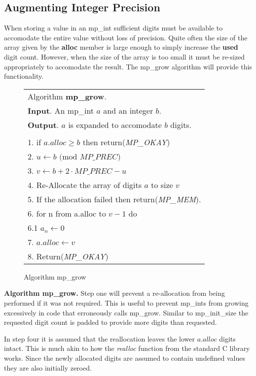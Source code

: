 \documentclass[b5paper]{book}
\begin{document}
\subsection{Augmenting Integer Precision}
When storing a value in an mp\_int sufficient digits must be available to accomodate the entire value without
loss of precision.  Quite often the size of the array given by the \textbf{alloc} member is large enough to simply
increase the \textbf{used} digit count.  However, when the size of the array is too small it must be re-sized 
appropriately to accomodate the result.  The mp\_grow algorithm will provide this functionality.

\begin{figure}[here]
\begin{center}
\begin{tabular}{l}
\hline Algorithm \textbf{mp\_grow}. \\
\textbf{Input}.   An mp\_int $a$ and an integer $b$. \\
\textbf{Output}.  $a$ is expanded to accomodate $b$ digits. \\
\hline \\
1.  if $a.alloc \ge b$ then return(\textit{MP\_OKAY}) \\
2.  $u \leftarrow b\mbox{ (mod }MP\_PREC\mbox{)}$ \\
3.  $v \leftarrow b + 2 \cdot MP\_PREC - u$ \\
4.  Re-Allocate the array of digits $a$ to size $v$ \\
5.  If the allocation failed then return(\textit{MP\_MEM}). \\
6.  for n from a.alloc to $v - 1$ do  \\
\hspace{+3mm}6.1  $a_n \leftarrow 0$ \\
7.  $a.alloc \leftarrow v$ \\
8.  Return(\textit{MP\_OKAY}) \\
\hline
\end{tabular}
\end{center}
\caption{Algorithm mp\_grow}
\end{figure}

\textbf{Algorithm mp\_grow.}
Step one will prevent a re-allocation from being performed if it was not required.  This is useful to prevent mp\_ints
from growing excessively in code that erroneously calls mp\_grow.  Similar to mp\_init\_size the requested digit count
is padded to provide more digits than requested.  

In step four it is assumed that the reallocation leaves the lower $a.alloc$ digits intact.  This is much akin to how the 
\textit{realloc} function from the standard C library works.  Since the newly allocated digits are assumed to contain
undefined values they are also initially zeroed.
\end{document}
